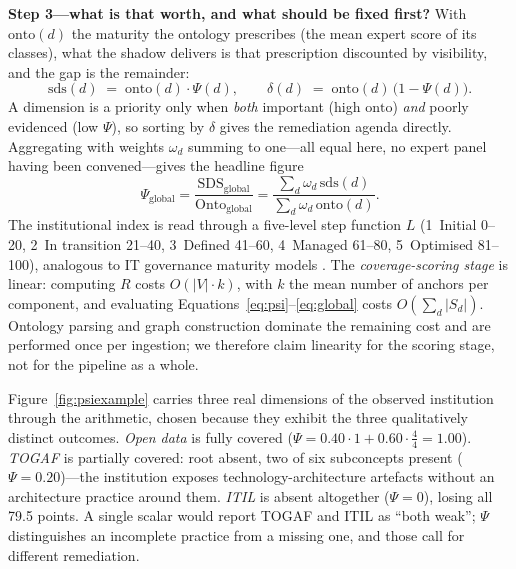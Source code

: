 \documentclass[engproc,proceedingpaper,submit,moreauthors]{Definitions/mdpi}
\begin{document}
\textbf{Step 3---what is that worth, and what should be fixed first?} With $\mathrm{onto}(d)$ the maturity the ontology prescribes (the mean expert score of its classes), what the shadow delivers is that prescription discounted by visibility, and the gap is the remainder:
\begin{equation}
\mathrm{sds}(d) \;=\; \mathrm{onto}(d)\cdot\Psi(d),
\qquad
\delta(d) \;=\; \mathrm{onto}(d)\,\bigl(1-\Psi(d)\bigr).
\label{eq:delta}
\end{equation}
A dimension is a priority only when \emph{both} important (high $\mathrm{onto}$) \emph{and} poorly evidenced (low $\Psi$), so sorting by $\delta$ gives the remediation agenda directly. Aggregating with weights $\omega_d$ summing to one---all equal here, no expert panel having been convened---gives the headline figure
\begin{equation}
\Psi_{\mathrm{global}}=\frac{\mathrm{SDS}_{\mathrm{global}}}{\mathrm{Onto}_{\mathrm{global}}}=\frac{\sum_d \omega_d\,\mathrm{sds}(d)}{\sum_d \omega_d\,\mathrm{onto}(d)}.
\label{eq:global}
\end{equation} The institutional index is read through a five-level step function $L$ (1~Initial 0--20, 2~In transition 21--40, 3~Defined 41--60, 4~Managed 61--80, 5~Optimised 81--100), analogous to IT governance maturity models \cite{DeHaes2013}. The \emph{coverage-scoring stage} is linear: computing $R$ costs $O(|V|\cdot k)$, with $k$ the mean number of anchors per component, and evaluating Equations~\eqref{eq:psi}--\eqref{eq:global} costs $O(\sum_d|S_d|)$. Ontology parsing and graph construction dominate the remaining cost and are performed once per ingestion; we therefore claim linearity for the scoring stage, not for the pipeline as a whole.

Figure~\ref{fig:psiexample} carries three real dimensions of the observed institution through the arithmetic, chosen because they exhibit the three qualitatively distinct outcomes. \emph{Open data} is fully covered ($\Psi=0.40\cdot 1+0.60\cdot\frac{4}{4}=1.00$). \emph{TOGAF} is partially covered: root absent, two of six subconcepts present ($\Psi=0.20$)---the institution exposes technology-architecture artefacts without an architecture practice around them. \emph{ITIL} is absent altogether ($\Psi=0$), losing all 79.5 points. A single scalar would report TOGAF and ITIL as ``both weak''; $\Psi$ distinguishes an incomplete practice from a missing one, and those call for different remediation.
\end{document}
